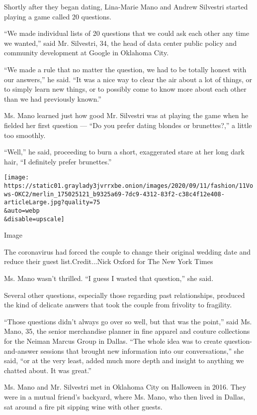 Shortly after they began dating, Lina-Marie Mano and Andrew Silvestri
started playing a game called 20 questions.

``We made individual lists of 20 questions that we could ask each other
any time we wanted,'' said Mr. Silvestri, 34, the head of data center
public policy and community development at Google in Oklahoma City.

``We made a rule that no matter the question, we had to be totally
honest with our answers,'' he said. ``It was a nice way to clear the air
about a lot of things, or to simply learn new things, or to possibly
come to know more about each other than we had previously known.''

Ms. Mano learned just how good Mr. Silvestri was at playing the game
when he fielded her first question --- ``Do you prefer dating blondes or
brunettes?,'' a little too smoothly.

``Well,'' he said, proceeding to burn a short, exaggerated stare at her
long dark hair, ``I definitely prefer brunettes.''

\texttt{[image: https://static01.graylady3jvrrxbe.onion/images/2020/09/11/fashion/11Vows-OKC2/merlin\_175025121\_b9325a69-7dc9-4312-83f2-c38c4f12e408-articleLarge.jpg?quality=75\\\&auto=webp\\\&disable=upscale]}

Image

The coronavirus had forced the couple to change their original wedding
date and reduce their guest list.Credit...Nick Oxford for The New York
Times

Ms. Mano wasn't thrilled. ``I guess I wasted that question,'' she said.

Several other questions, especially those regarding past relationships,
produced the kind of delicate answers that took the couple from
frivolity to fragility.

``Those questions didn't always go over so well, but that was the
point,'' said Ms. Mano, 35, the senior merchandise planner in fine
apparel and couture collections for the Neiman Marcus Group in Dallas.
``The whole idea was to create question-and-answer sessions that brought
new information into our conversations,'' she said, ``or at the very
least, added much more depth and insight to anything we chatted about.
It was great.''

Ms. Mano and Mr. Silvestri met in Oklahoma City on Halloween in 2016.
They were in a mutual friend's backyard, where Ms. Mano, who then lived
in Dallas, sat around a fire pit sipping wine with other guests.

